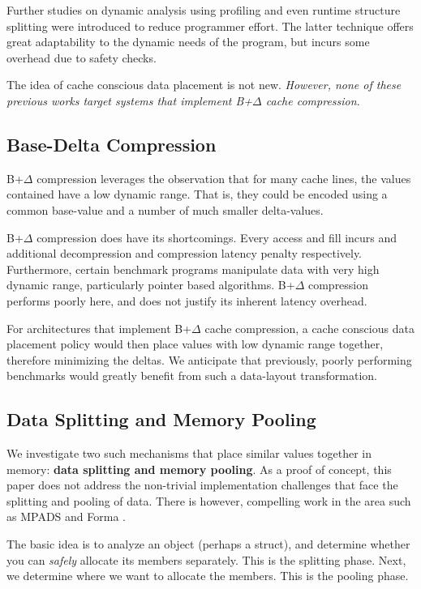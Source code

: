 \documentclass[pageno]{jpaper}
\begin{document}
Further studies on dynamic analysis using profiling \cite{autoPoolAlloc} and even runtime structure splitting \cite{runtimeSplit} were introduced to reduce programmer effort. The latter technique offers great adaptability to the dynamic needs of the program, but incurs some overhead due to safety checks.

The idea of cache conscious data placement is not new. \textit{However, none of these previous works target systems that implement B+$\Delta$ cache compression}.


\subsection{Base-Delta Compression}

B+$\Delta$ compression \cite{baseDeltaImm} leverages the observation that for many cache lines, the values contained have a low dynamic range. That is, they could be encoded using a common base-value and a number of much smaller delta-values.

B+$\Delta$ compression does have its shortcomings. Every access and fill incurs and additional decompression and compression latency penalty respectively. Furthermore, certain benchmark programs manipulate data with very high dynamic range, particularly pointer based algorithms. B+$\Delta$ compression performs poorly here, and does not justify its inherent latency overhead.

For architectures that implement B+$\Delta$ cache compression, a cache conscious data placement policy would then place values with low dynamic range together, therefore minimizing the deltas. We anticipate that previously, poorly performing benchmarks would greatly benefit from such a data-layout transformation.


\subsection{Data Splitting and Memory Pooling}
We investigate two such mechanisms that place similar values together in memory: \textbf{data splitting and memory pooling}. As a proof of concept, this paper does not address the non-trivial implementation challenges that face the splitting and pooling of data. There is however, compelling work in the area such as MPADS \cite{mpads} and Forma \cite{forma}.

The basic idea is to analyze an object (perhaps a struct), and determine whether you can \textit{safely} allocate its members separately. This is the splitting phase. Next, we determine where we want to allocate the members. This is the pooling phase.
\end{document}

